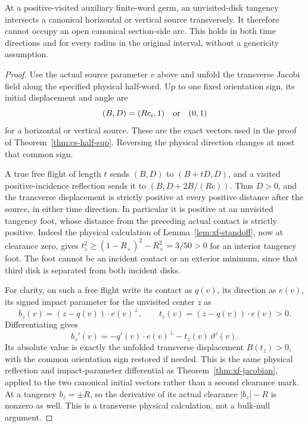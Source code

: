 \begin{lemma}
\label{lem:iso-transverse}
At a positive-visited auxiliary finite-word germ, an unvisited-disk
tangency intersects a canonical horizontal or vertical source
transversely. It therefore cannot occupy an open canonical
section-side arc. This holds in both time directions and for every
radius in the original interval, without a genericity assumption.
\end{lemma}
\begin{proof}
Use the actual source parameter $v$ above and unfold the transverse
Jacobi field along the specified physical half-word. Up to one
fixed orientation sign, its initial displacement and angle are
\[
                 (B,D)=(Rc_i,1)\quad\hbox{or}\quad(0,1)
\]
for a horizontal or vertical source. These are the exact vectors
used in the proof of Theorem~\ref{thm:cs-half-sup}. Reversing the
physical direction changes at most that common sign.

A true free flight of length $t$ sends $(B,D)$ to $(B+tD,D)$,
and a visited positive-incidence reflection sends it to
$(B,D+2B/(Rc))$. Thus $D>0$, and the transverse displacement
is strictly positive at every positive distance after the source,
in either time direction. In particular it is positive at an
unvisited tangency foot, whose distance from the preceding actual
contact is strictly positive. Indeed the physical calculation of
Lemma~\ref{lem:xf-standoff}, now at clearance zero, gives
$t_z^2\ge(1-R_+)^2-R_+^2=3/50>0$ for an interior tangency foot.
The foot cannot be an incident contact or an exterior minimum,
since that third disk is separated from both incident disks.

For clarity, on such a free flight write its contact as $q(v)$,
its direction as $e(v)$, its signed impact parameter for the
unvisited center $z$ as
\[
 b_z(v)=(z-q(v))\cdot e(v)^\perp,\qquad
 t_z(v)=(z-q(v))\cdot e(v)>0.
\]
Differentiating gives
\[
 b_z'(v)=-q'(v)\cdot e(v)^\perp
                     -t_z(v)\,\vartheta'(v).
\]
Its absolute value is exactly the unfolded transverse displacement
$B(t_z)>0$, with the common orientation sign restored if needed.
This is the same physical reflection and impact-parameter
differential as Theorem~\ref{thm:xf-jacobian}, applied to the
two canonical initial vectors rather than a second clearance mark.
At a tangency $b_z=\pm R$, so the derivative of its actual clearance
$|b_z|-R$ is nonzero as well. This is a transverse physical
calculation, not a bulk-null argument.


\end{proof}
